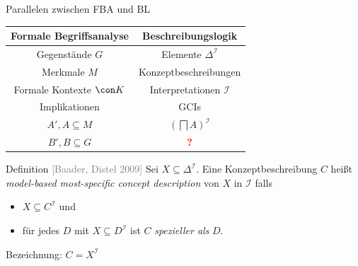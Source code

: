 \documentclass[ngerman]{beamer}
\newcommand{\pseudocite}[1]{\textcolor{gray}{[#1]}}
\begin{document}
\begin{frame}

  \onslide<+->

  \begin{block}{Parallelen zwischen FBA und BL}
    \begin{center}
      \begin{tabular}{c|c}
        Formale Begriffsanalyse & Beschreibungslogik \\
        \midrule\onslide<+->
        Gegenstände $G$ & Elemente $\Delta^{\mathcal{I}}$ \\\onslide<+->
        Merkmale $M$ & Konzeptbeschreibungen \\\onslide<+->
        Formale Kontexte $\con K$ & Interpretationen $\mathcal{I}$ \\\onslide<+->
        Implikationen & GCIs \\\onslide<+->
        $A', A \subseteq M$ & $(\bigsqcap A)^{\mathcal{I}}$ \\\onslide<+->
        $B', B \subseteq G$ & \textcolor{red}{\textbf{?}}
      \end{tabular}
    \end{center}
  \end{block}

  \onslide<+->

  \begin{block}{Definition \pseudocite{Baader, Distel 2009}}
    Sei $X \subseteq \Delta^{\mathcal{I}}$. \onslide<+-> Eine Konzeptbeschreibung $C$
    heißt \emph{model-based most-specific concept description} von $X$ in $\mathcal{I}$
    falls
    \begin{itemize}
    \item<+-> $X \subseteq C^{\mathcal{I}}$ und
    \item<+-> für jedes $D$ mit $X \subseteq D^{\mathcal{I}}$ ist $C$ \emph{spezieller
        als} $D$.
    \end{itemize}
    \onslide<+->%
    Bezeichnung: $C = X^{\mathcal{I}}$
  \end{block}

\end{frame}



\end{document}
